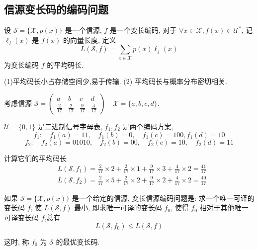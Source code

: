 \subsection{信源变长码的编码问题}

\begin{definition}
    设 $ \mathscr{S}=\{\mathscr{X}, p(x)\} $ 是一个信源, $ f $ 是一个变长编码, 对于 $ \forall x \in \mathscr{X}, f(x) \in \mathscr{U}^{*} $, 记 $ \ell_{f}(x) $ 是 $ f(x) $ 的向量长度, 定义 $$ L(\mathscr{S}, f)=\sum_{x \in \mathscr{X}} p(x) \ell_{f}(x) $$ 为变长编码 $ f $ 的平均码长.
\end{definition}
\begin{remark}
    (1)平均码长小占存储空间少,易于传输.
(2) 平均码长与概率分布密切相关.
\end{remark}

\begin{example}
    考虑信源 $ \mathscr{S}=\left(\begin{array}{cccc}a & b & c & d \\ \frac{2}{17} & \frac{2}{17} & \frac{9}{17} & \frac{4}{17}\end{array}\right) \quad \mathscr{X}=\{a, b, c, d \}$.
    
    $ \mathscr{U}=\{0,1\} $ 是二进制信号字母表, $ f_{1}, f_{2} $ 是两个编码方案, 
    $$ f_{1}: \quad f_{1}(a)=11, \quad f_{1}(b)=0, \quad f_{1}(c)=100, f_{1}(d)=10 $$
    $$ f_{2}: \quad f_{2}(a)=01010, \quad f_{2}(b)=00, \quad f_{2}(c)=10, \quad f_{2}(d)=11 $$

计算它们的平均码长
$$
\begin{aligned}
&L\left(\mathscr{S}, f_{1}\right)=\frac{2}{17} \times 2+\frac{2}{17} \times 1+\frac{9}{17} \times 3+\frac{4}{17} \times 2=\frac{41}{17} \\
&L\left(\mathscr{S}, f_{2}\right)=\frac{2}{17} \times 5+\frac{2}{17} \times 2+\frac{9}{17} \times 2+\frac{4}{17} \times 2=\frac{40}{17}
\end{aligned}
$$
\end{example}

\begin{definition}[变长信源编码问题]
    如果 $ \mathscr{S}=\{\mathscr{X}, p(x)\} $ 是一个给定的信源, 变长信源编码问题是: 求一个唯一可译的变长码 $ f $, 使 $ L(\mathscr{S}, f) $ 最小, 即求唯一可译的变长码 $ f_{0} $, 使得 $ f_{0} $ 相对于其他唯一可译变长码 $ f $,总有
$$
L\left(\mathscr{S}, f_{0}\right) \leq L(\mathscr{S}, f)
$$

这时, 称 $ f_{0} $ 为 $ \mathscr{S} $ 的最优变长码.
\end{definition}

